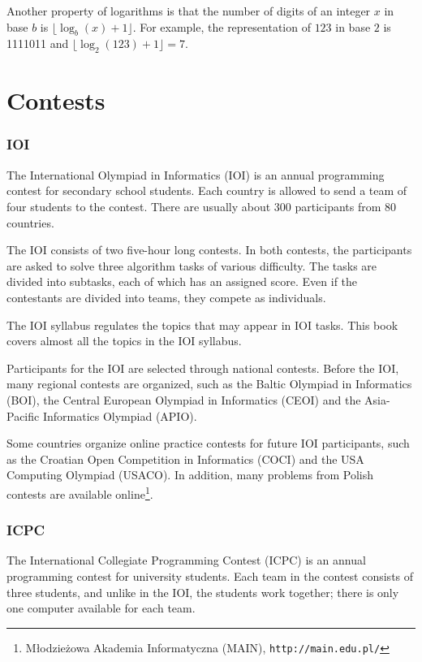Another property of logarithms is that
the number of digits of an integer $x$ in base $b$ is
$\lfloor \log_b(x)+1 \rfloor$.
For example, the representation of
$123$ in base $2$ is 1111011 and
$\lfloor \log_2(123)+1 \rfloor = 7$.

\section{Contests}

\subsubsection{IOI}

The International Olympiad in Informatics (IOI)
is an annual programming contest for
secondary school students.
Each country is allowed to send a team of
four students to the contest.
There are usually about 300 participants
from 80 countries.

The IOI consists of two five-hour long contests.
In both contests, the participants are asked to
solve three algorithm tasks of various difficulty.
The tasks are divided into subtasks,
each of which has an assigned score.
Even if the contestants are divided into teams,
they compete as individuals.

The IOI syllabus \cite{iois} regulates the topics
that may appear in IOI tasks.
This book covers almost all the topics in the IOI syllabus.

Participants for the IOI are selected through
national contests.
Before the IOI, many regional contests are organized,
such as the Baltic Olympiad in Informatics (BOI),
the Central European Olympiad in Informatics (CEOI)
and the Asia-Pacific Informatics Olympiad (APIO).

Some countries organize online practice contests
for future IOI participants,
such as the Croatian Open Competition in Informatics (COCI)
and the USA Computing Olympiad (USACO).
In addition,
many problems from Polish contests
are available online\footnote{Młodzieżowa Akademia Informatyczna (MAIN), \texttt{http://main.edu.pl/}}.

\subsubsection{ICPC}

The International Collegiate Programming Contest (ICPC)
is an annual programming contest for university students.
Each team in the contest consists of three students,
and unlike in the IOI, the students work together;
there is only one computer available for each team.

